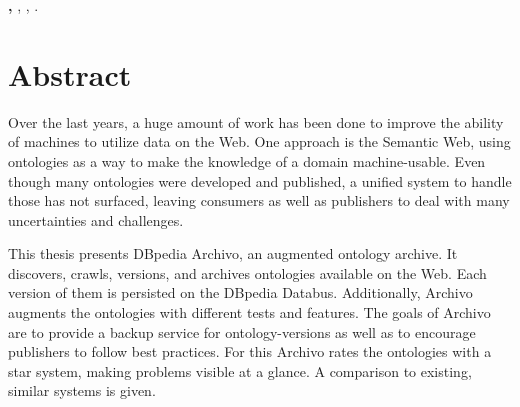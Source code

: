 \thispagestyle{empty}
\vspace*{\fill}
\begin{minipage}{.95\textwidth}
\textbf{\mylastname,\myfirstname}\newline
\emph{\titleOfThesis}\newline
\kindOfThesis, \myuni \newline
\myplace, \myyear.
\end{minipage}

\cleardoublepage



\setcounter{tocdepth}{2}
\tableofcontents




\cleardoublepage

\section*{Abstract}
Over the last years, a huge amount of work has been done to improve the ability of machines to utilize data on the Web. One approach is the Semantic Web, using ontologies as a way to make the knowledge of a domain machine-usable. Even though many ontologies were developed and published, a unified system to handle those has not surfaced, leaving consumers as well as publishers to deal with many uncertainties and challenges. 

This thesis presents DBpedia Archivo, an augmented ontology archive. It discovers, crawls, versions, and archives ontologies available on the Web. Each version of them is persisted on the DBpedia Databus. Additionally, Archivo augments the ontologies with different tests and features. 
The goals of Archivo are to provide a backup service for ontology-versions as well as to encourage publishers to follow best practices. 
For this Archivo rates the ontologies with a star system, making problems visible at a glance. A comparison to existing, similar systems is given.

